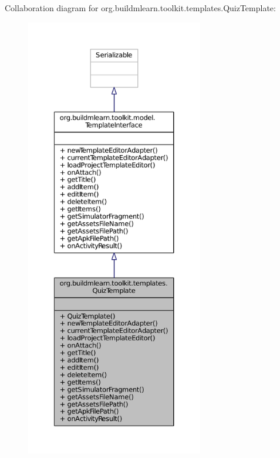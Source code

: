 Collaboration diagram for org.\-buildmlearn.\-toolkit.\-templates.\-Quiz\-Template\-:
\nopagebreak
\begin{figure}[H]
\begin{center}
\leavevmode
\includegraphics[height=550pt]{db/d9c/classorg_1_1buildmlearn_1_1toolkit_1_1templates_1_1QuizTemplate__coll__graph}
\end{center}
\end{figure}
